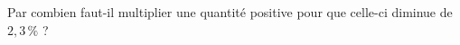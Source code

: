 
Par combien faut-il multiplier une quantité positive pour que celle-ci diminue de $2,3\,\%$ ?

\smallskip

